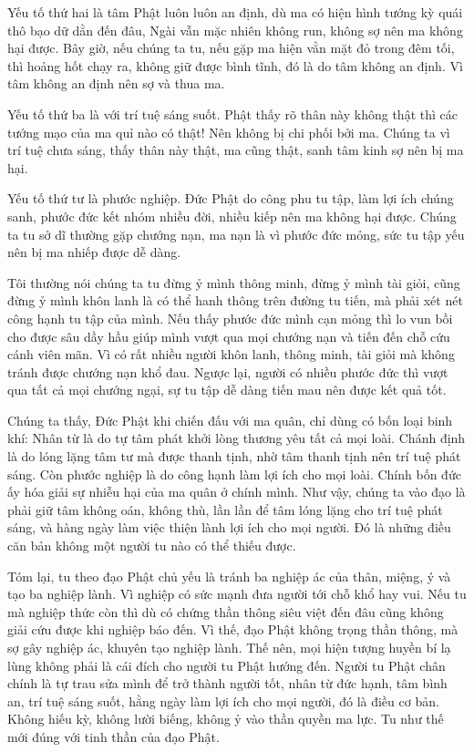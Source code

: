 \documentclass[
  12pt,
  oneside]{book}
\begin{document}
Yếu tố thứ hai là tâm Phật luôn luôn an định, dù ma có hiện hình tướng kỳ quái thô bạo dữ dằn đến đâu, Ngài vẫn mặc nhiên không run, không sợ nên ma không hại được. Bây giờ, nếu chúng ta tu, nếu gặp ma hiện vằn mặt đỏ trong đêm tối, thì hoảng hốt chạy ra, không giữ được bình tĩnh, đó là do tâm không an định. Vì tâm không an định nên sợ và thua ma.

Yếu tố thứ ba là với trí tuệ sáng suốt. Phật thấy rõ thân này không thật thì các tướng mạo của ma quỉ nào có thật! Nên không bị chi phối bởi ma. Chúng ta vì trí tuệ chưa sáng, thấy thân này thật, ma cũng thật, sanh tâm kinh sợ nên bị ma hại.

Yếu tố thứ tư là phước nghiệp. Đức Phật do công phu tu tập, làm lợi ích chúng sanh, phước đức kết nhóm nhiều đời, nhiều kiếp nên ma không hại được. Chúng ta tu sở dĩ thường gặp chướng nạn, ma nạn là vì phước đức mỏng, sức tu tập yếu nên bị ma nhiếp được dễ dàng.

Tôi thường nói chúng ta tu đừng ỷ mình thông minh, đừng ỷ mình tài giỏi, cũng đừng ỷ mình khôn lanh là có thể hanh thông trên đường tu tiến, mà phải xét nét công hạnh tu tập của mình. Nếu thấy phước đức mình cạn mỏng thì lo vun bồi cho được sâu dầy hầu giúp mình vượt qua mọi chướng nạn và tiến đến chỗ cứu cánh viên mãn. Vì có rất nhiều người khôn lanh, thông minh, tài giỏi mà không tránh được chướng nạn khổ đau. Ngược lại, người có nhiều phước đức thì vượt qua tất cả mọi chướng ngại, sự tu tập dễ dàng tiến mau nên được kết quả tốt.

Chúng ta thấy, Đức Phật khi chiến đấu với ma quân, chỉ dùng có bốn loại binh khí: Nhân từ là do tự tâm phát khởi lòng thương yêu tất cả mọi loài. Chánh định là do lóng lặng tâm tư mà được thanh tịnh, nhờ tâm thanh tịnh nên trí tuệ phát sáng. Còn phước nghiệp là do công hạnh làm lợi ích cho mọi loài. Chính bốn đức ấy hóa giải sự nhiễu hại của ma quân ở chính mình. Như vậy, chúng ta vào đạo là phải giữ tâm không oán, không thù, lần lần để tâm lóng lặng cho trí tuệ phát sáng, và hàng ngày làm việc thiện lành lợi ích cho mọi người. Đó là những điều căn bản không một người tu nào có thể thiếu được.

Tóm lại, tu theo đạo Phật chủ yếu là tránh ba nghiệp ác của thân, miệng, ý và tạo ba nghiệp lành. Vì nghiệp có sức mạnh đưa người tới chỗ khổ hay vui. Nếu tu mà nghiệp thức còn thì dù có chứng thần thông siêu việt đến đâu cũng không giải cứu được khi nghiệp báo đến. Vì thế, đạo Phật không trọng thần thông, mà sợ gây nghiệp ác, khuyên tạo nghiệp lành. Thế nên, mọi hiện tượng huyền bí lạ lùng không phải là cái đích cho người tu Phật hướng đến. Người tu Phật chân chính là tự trau sửa mình để trở thành người tốt, nhân từ đức hạnh, tâm bình an, trí tuệ sáng suốt, hằng ngày làm lợi ích cho mọi người, đó là điều cơ bản. Không hiếu kỳ, không lười biếng, không ỷ vào thần quyền ma lực. Tu như thế mới đúng với tinh thần của đạo Phật.
\end{document}
